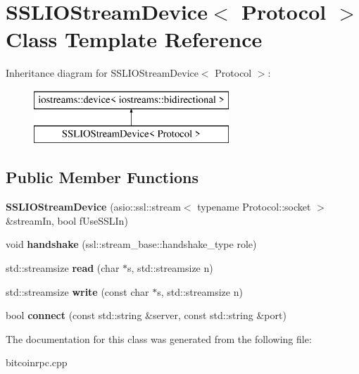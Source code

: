 \hypertarget{class_s_s_l_i_o_stream_device}{}\section{S\+S\+L\+I\+O\+Stream\+Device$<$ Protocol $>$ Class Template Reference}
\label{class_s_s_l_i_o_stream_device}
Inheritance diagram for S\+S\+L\+I\+O\+Stream\+Device$<$ Protocol $>$\+:\begin{figure}[H]
\begin{center}
\leavevmode
\includegraphics[height=2.000000cm]{class_s_s_l_i_o_stream_device}
\end{center}
\end{figure}
\subsection*{Public Member Functions}
\begin{DoxyCompactItemize}
\item 
\mbox{\label{class_s_s_l_i_o_stream_device_a3a030f89897a9d3f07de4d995facd735}} 
{\bfseries S\+S\+L\+I\+O\+Stream\+Device} (asio\+::ssl\+::stream$<$ typename Protocol\+::socket $>$ \&stream\+In, bool f\+Use\+S\+S\+L\+In)
\item 
\mbox{\label{class_s_s_l_i_o_stream_device_aa54f83079ab7da754ea5c8bbf5dd6c4d}} 
void {\bfseries handshake} (ssl\+::stream\+\_\+base\+::handshake\+\_\+type role)
\item 
\mbox{\label{class_s_s_l_i_o_stream_device_a8beb626f163adac311a5ec507c3e495a}} 
std\+::streamsize {\bfseries read} (char $\ast$s, std\+::streamsize n)
\item 
\mbox{\label{class_s_s_l_i_o_stream_device_aa4bfad893484ffdf9dbcdce97c462ad0}} 
std\+::streamsize {\bfseries write} (const char $\ast$s, std\+::streamsize n)
\item 
\mbox{\label{class_s_s_l_i_o_stream_device_acdded14a6c79e263989ebf8aea392405}} 
bool {\bfseries connect} (const std\+::string \&server, const std\+::string \&port)
\end{DoxyCompactItemize}


The documentation for this class was generated from the following file\+:\begin{DoxyCompactItemize}
\item 
bitcoinrpc.\+cpp\end{DoxyCompactItemize}

